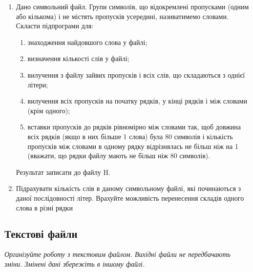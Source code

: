 \documentclass[]{article}
\makeatletter
\newcommand{\xslalph}[1]{\expandafter\@xslalph\csname c@#1\endcsname}
\newcommand{\@xslalph}[1]{%
    \ifcase#1\or а\or б\or в\or г\or д\or e\or є\or ж\or з\or i%
    \or й\or к\or л\or м\or н\or о\or п\or р\or с\or т%
    \or у\or ф\or х\or ц\or ч\or ш\or ю\or я\or аа\or бб\or вв %
    \else\@ctrerr\fi%
}
\makeatother
\begin{document}
\begin{enumerate}
\item
Дано символьний файл. Групи символів, що відокремлені пропусками (одним
або кількома) і не містять пропусків усередині, називатимемо словами.
Скласти підпрограми для:
\begin{enumerate}[label=\xslalph*)]
\item
знаходження найдовшого слова у файлі;
\item
визначення кількості слів у файлі;
\item
вилучення з файлу зайвих пропусків і всіх слів, що складаються з
однієї літери;
\item
вилучення всіх пропусків на початку рядків, у кінці рядків і між
словами (крім одного);
\item
вставки пропусків до рядків рівномірно між словами так, щоб довжина
всіх рядків (якщо в них більше 1 слова) була 80 символів і кількість
пропусків між словами в одному рядку відрізнялась не більш ніж на 1
(вважати, що рядки файлу мають не більш ніж 80 символів).
\end{enumerate}
Результат записати до файлу H.
\item

Підрахувати кількість слів в даному символьному файлі, які починаються з
даної послідовності літер. Врахуйте можливість перенесення складів
одного слова в різні рядки

\end{enumerate}

\subsection{ Текстові файли}

\emph{Організуйте роботу з текстовим
файлом. Вихідні файли не передбачають зміни. Змінені дані збережіть в
іншому файлі.}
\end{document}
